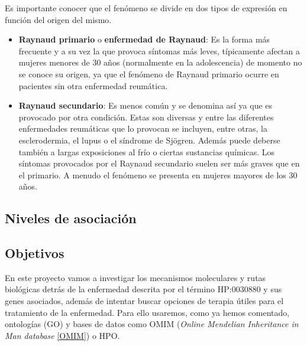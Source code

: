 Es importante conocer que el fenómeno se divide en dos tipos de expresión en función del origen del mismo.
\begin{itemize}
	\item \textbf{Raynaud primario} o \textbf{enfermedad de Raynaud}: Es la forma más frecuente y a su vez la que provoca síntomas más leves, típicamente afectan a mujeres menores de 30 años (normalmente en la adolescencia) de momento no se conoce su origen, ya que el fenómeno de Raynaud primario ocurre en pacientes sin otra enfermedad reumática. \cite{RaynaudFen}
	
	\item \textbf{Raynaud secundario}: Es menos común y se denomina así ya que es provocado por otra condición. Estas son diversas y entre las diferentes enfermedades reumáticas que lo provocan se incluyen, entre otras, la esclerodermia, el lupus o el síndrome de Sjögren. Además puede deberse también a largas exposiciones al frío o ciertas sustancias químicas. Los síntomas provocados por el Raynaud secundario suelen ser más graves que en el primario. A menudo el fenómeno se presenta en mujeres mayores de los 30 años. \cite{RaynaudClass}
\end{itemize}

\subsection{Niveles de asociación}

\subsection{Objetivos}

En este proyecto vamos a investigar los mecanismos moleculares y rutas biológicas detrás de la enfermedad descrita por el término HP:0030880 y sus genes asociados, además de intentar buscar opciones de terapia útiles para el tratamiento de la enfermedad. Para ello usaremos, como ya hemos comentado, ontologías (GO) y bases de datos como OMIM (\textit{Online Mendelian Inheritance in Man database} \ref{OMIM}) o HPO.

